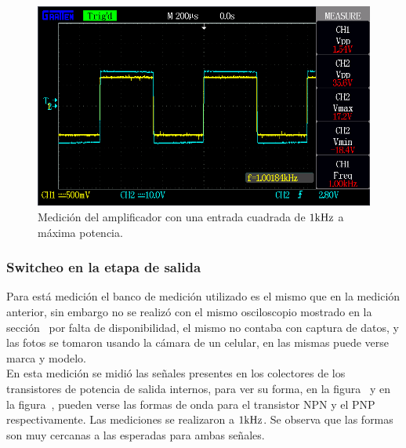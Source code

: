 \begin{figure}[H]
        \centering
        \includegraphics[width=0.95 \textwidth]{./img/mediciones/Power/2.png}
        \caption{Medición del amplificador con una entrada cuadrada de $1 \si[per-mode=symbol]{\kilo\hertz}$ a máxima potencia.}
        \label{fig:estab2}
\end{figure}

\vfill

\clearpage

\subsubsection{Switcheo en la etapa de salida}

Para está medición el banco de medición utilizado es el mismo que en la medición anterior, sin embargo no se realizó con el mismo osciloscopio mostrado en la sección~ por falta de disponibilidad, el mismo no contaba con captura de datos, y las fotos se tomaron usando la cámara de un celular, en las mismas puede verse marca y modelo.\\

En esta medición se midió las señales presentes en los colectores de los transistores de potencia de salida internos, para ver su forma, en la figura~ y en la figura~, pueden verse las formas de onda para el transistor NPN y el PNP respectivamente. Las mediciones se realizaron a $1 \si[per-mode=symbol]{\kilo\hertz}$. Se observa que las formas son muy cercanas a las esperadas para ambas señales.\\


\vfill

\clearpage


